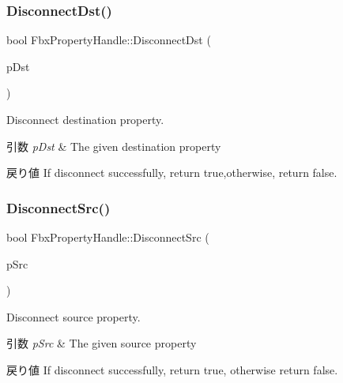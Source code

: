 \subsubsection{\texorpdfstring{Disconnect\+Dst()}{DisconnectDst()}}
{\footnotesize\ttfamily bool Fbx\+Property\+Handle\+::\+Disconnect\+Dst (\begin{DoxyParamCaption}\item[{const \hyperlink{class_fbx_property_handle}{Fbx\+Property\+Handle} \&}]{p\+Dst }\end{DoxyParamCaption})}

Disconnect destination property. 
\begin{DoxyParams}{引数}
{\em p\+Dst} & The given destination property \\
\hline
\end{DoxyParams}
\begin{DoxyReturn}{戻り値}
If disconnect successfully, return true,otherwise, return false. 
\end{DoxyReturn}
\mbox{\label{class_fbx_property_handle_a1e7e6be842dac23fce8708f182e9e8c3}} 
\subsubsection{\texorpdfstring{Disconnect\+Src()}{DisconnectSrc()}}
{\footnotesize\ttfamily bool Fbx\+Property\+Handle\+::\+Disconnect\+Src (\begin{DoxyParamCaption}\item[{const \hyperlink{class_fbx_property_handle}{Fbx\+Property\+Handle} \&}]{p\+Src }\end{DoxyParamCaption})}

Disconnect source property. 
\begin{DoxyParams}{引数}
{\em p\+Src} & The given source property \\
\hline
\end{DoxyParams}
\begin{DoxyReturn}{戻り値}
If disconnect successfully, return true, otherwise return false. 
\end{DoxyReturn}
\mbox{\label{class_fbx_property_handle_a05f9bc5dcbb93bbde02ffc6c7b640632}} 
